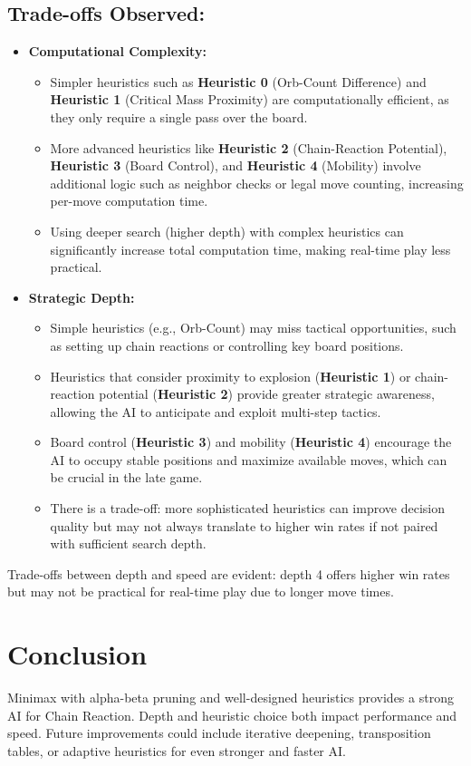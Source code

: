 \documentclass[11pt,a4paper]{article}
\begin{document}
\subsection*{Trade-offs Observed:}
\begin{itemize}
  \item \textbf{Computational Complexity:}
    \begin{itemize}
      \item Simpler heuristics such as \textbf{Heuristic 0} (Orb-Count Difference) and \textbf{Heuristic 1} (Critical Mass Proximity) are computationally efficient, as they only require a single pass over the board.
      \item More advanced heuristics like \textbf{Heuristic 2} (Chain-Reaction Potential), \textbf{Heuristic 3} (Board Control), and \textbf{Heuristic 4} (Mobility) involve additional logic such as neighbor checks or legal move counting, increasing per-move computation time.
      \item Using deeper search (higher depth) with complex heuristics can significantly increase total computation time, making real-time play less practical.
    \end{itemize}
  \item \textbf{Strategic Depth:}
    \begin{itemize}
      \item Simple heuristics (e.g., Orb-Count) may miss tactical opportunities, such as setting up chain reactions or controlling key board positions.
      \item Heuristics that consider proximity to explosion (\textbf{Heuristic 1}) or chain-reaction potential (\textbf{Heuristic 2}) provide greater strategic awareness, allowing the AI to anticipate and exploit multi-step tactics.
      \item Board control (\textbf{Heuristic 3}) and mobility (\textbf{Heuristic 4}) encourage the AI to occupy stable positions and maximize available moves, which can be crucial in the late game.
      \item There is a trade-off: more sophisticated heuristics can improve decision quality but may not always translate to higher win rates if not paired with sufficient search depth.
    \end{itemize}
\end{itemize}

Trade-offs between depth and speed are evident: depth 4 offers higher win rates but may not be practical for real-time play due to longer move times.

\section{Conclusion}
Minimax with alpha-beta pruning and well-designed heuristics provides a strong AI for Chain Reaction. Depth and heuristic choice both impact performance and speed. Future improvements could include iterative deepening, transposition tables, or adaptive heuristics for even stronger and faster AI.
\end{document}
